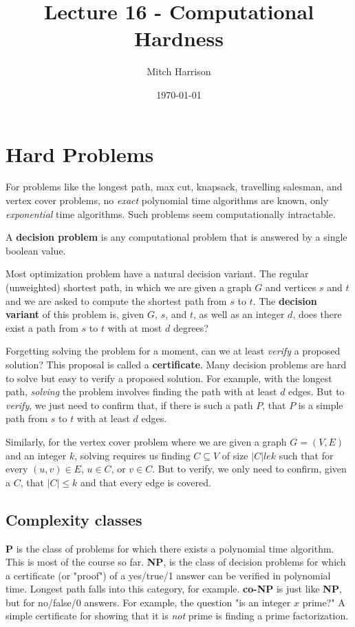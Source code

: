 \documentclass[titlepage, 12pt, leqno]{article}
\title{\Huge{Lecture 16 - Computational Hardness}}
\author{\large{Mitch Harrison}}
\date{\today}
\begin{document}
\setlength{\parskip}{1\baselineskip}
\setlength{\parindent}{15pt}
\maketitle
\tableofcontents
\newpage


\section{Hard Problems}

For problems like the longest path, max cut, knapsack, travelling salesman, and
vertex cover problems, no \textit{exact} polynomial time algorithms are known, 
only \textit{exponential} time algorithms. Such problems seem computationally
intractable.

\begin{definition}
    A \textbf{decision problem} is any computational problem that is answered by
    a single boolean value.
\end{definition}

Most optimization problem have a natural decision variant. The regular
(unweighted) shortest path, in which we are given a graph $G$ and vertices $s$
and $t$ and we are asked to compute the shortest path from $s$ to $t$. The
\textbf{decision variant} of this problem is, given $G$, $s$, and $t$, as well
as an integer $d$, does there exist a path from $s$ to $t$ with at most
$d$ degrees?

Forgetting solving the problem for a moment, can we at least \textit{verify}
a proposed solution? This proposal is called a \textbf{certificate}. Many
decision problems are hard to solve but easy to verify a proposed solution. For
example, with the longest path, \textit{solving} the problem involves finding
the path with at least $d$ edges. But to \textit{verify}, we just need to confirm
that, if there is such a path $P$, that $P$ is a simple path from $s$ to $t$ 
with at least $d$ edges.

Similarly, for the vertex cover problem where we are given a graph
$G = (V,E)$ and an integer $k$, solving requires us finding $C \subseteq V$ of
size $|C| le k$ such that for every $(u,v) \in E$, $u \in C$, or $v \in C$. But
to verify, we only need to confirm, given a $C$, that $|C|\le k$ and that
every edge is covered.

\subsection{Complexity classes}
\textbf{P} is the class of problems for which there exists a polynomial time
algorithm. This is most of the course so far. \textbf{NP}, is the class of
decision problems for which a certificate (or "proof") of a yes/true/1 answer
can be verified in polynomial time. Longest path falls into this category, for
example. \textbf{co-NP} is just like \textbf{NP}, but for no/false/0 answers.
For example, the question "is an integer $x$ prime?" A simple certificate for
showing that it is \textit{not} prime is finding a prime factorization.
\end{document}
